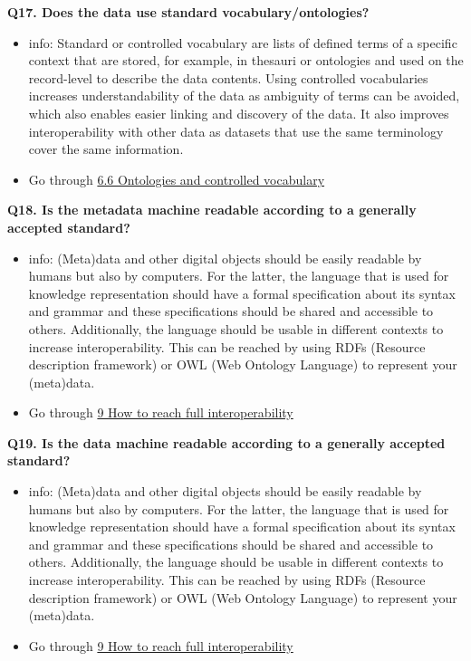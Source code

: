\documentclass[
  oneside]{book}
\providecommand{\tightlist}{%
  \setlength{\itemsep}{0pt}\setlength{\parskip}{0pt}}
\begin{document}
\textbf{Q17. Does the data use standard vocabulary/ontologies?}

\begin{itemize}
\tightlist
\item
  info: Standard or controlled vocabulary are lists of defined terms of a specific context that are stored, for example, in thesauri or ontologies and used on the record-level to describe the data contents. Using controlled vocabularies increases understandability of the data as ambiguity of terms can be avoided, which also enables easier linking and discovery of the data. It also improves interoperability with other data as datasets that use the same terminology cover the same information.
\item
  Go through \hyperref[ontologies]{6.6 Ontologies and controlled vocabulary}
\end{itemize}

\textbf{Q18. Is the metadata machine readable according to a generally accepted standard?}

\begin{itemize}
\tightlist
\item
  info: (Meta)data and other digital objects should be easily readable by humans but also by computers. For the latter, the language that is used for knowledge representation should have a formal specification about its syntax and grammar and these specifications should be shared and accessible to others. Additionally, the language should be usable in different contexts to increase interoperability. This can be reached by using RDFs (Resource description framework) or OWL (Web Ontology Language) to represent your (meta)data.
\item
  Go through \hyperref[fully-interoperable]{9 How to reach full interoperability}
\end{itemize}

\textbf{Q19. Is the data machine readable according to a generally accepted standard?}

\begin{itemize}
\tightlist
\item
  info: (Meta)data and other digital objects should be easily readable by humans but also by computers. For the latter, the language that is used for knowledge representation should have a formal specification about its syntax and grammar and these specifications should be shared and accessible to others. Additionally, the language should be usable in different contexts to increase interoperability. This can be reached by using RDFs (Resource description framework) or OWL (Web Ontology Language) to represent your (meta)data.
\item
  Go through \hyperref[fully-interoperable]{9 How to reach full interoperability}
\end{itemize}
\end{document}
